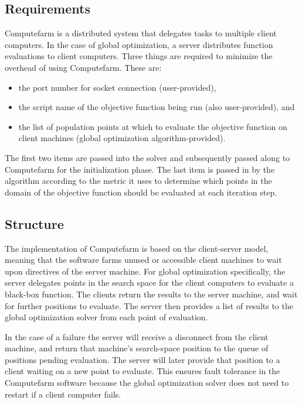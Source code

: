 \subsection{Requirements}
Computefarm is a distributed system that delegates tasks to multiple client computers. In the case of global optimization, a server distributes function evaluations to client computers. Three things are required to minimize the overhead of using Computefarm. These are:
\begin{itemize}
    \item the port number for socket connection (user-provided),
    \item the script name of the objective function being run (also user-provided), and
    \item the list of population points at which to evaluate the objective function on client machines (global optimization algorithm-provided).
\end{itemize}
The first two items are passed into the solver and subsequently passed along to Computefarm for the initialization phase. The last item is passed in by the algorithm according to the metric it uses to determine which points in the domain of the objective function should be evaluated at each iteration step.  
\subsection{Structure}
 The implementation of Computefarm is based on the client-server model, meaning that the software farms unused or accessible client machines to wait upon directives of the server machine. For global optimization specifically, the server delegates points in the search space for the client computers to evaluate a black-box function. The clients return the results to the server machine, and wait for further positions to evaluate. The server then provides a list of results to the global optimization solver from each point of evaluation. 


In the case of a failure the server will receive a disconnect from the client machine, and return that machine's search-space position to the queue of positions pending evaluation. The server will later provide that position to a client waiting on a new point to evaluate. This ensures fault tolerance in the Computefarm software because the global optimization solver does not need to restart if a client computer fails. 


